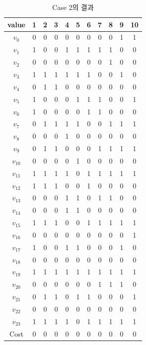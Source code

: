 \documentclass{article}
\begin{document}
    \begin{table}[htb!]
    \centering
    \begin{tabular}{c | c c c c c c c c c c}
        \hline
        value & 1 & 2 & 3 & 4 & 5 & 6 & 7 & 8 & 9 & 10 \\
        \hline
        $v_0$ & 0 & 0 & 0 & 0 & 0 & 0 & 0 & 0 & 1 & 1 \\
        $v_1$ & 1 & 0 & 0 & 1 & 1 & 1 & 1 & 1 & 0 & 0 \\
        $v_2$ & 0 & 0 & 0 & 0 & 0 & 0 & 0 & 1 & 0 & 0 \\
        $v_3$ & 1 & 1 & 1 & 1 & 1 & 1 & 0 & 0 & 1 & 0 \\
        $v_4$ & 0 & 1 & 1 & 0 & 0 & 0 & 0 & 0 & 0 & 0 \\
        $v_5$ & 1 & 0 & 0 & 0 & 1 & 1 & 1 & 0 & 0 & 1 \\
        $v_6$ & 1 & 0 & 0 & 0 & 0 & 1 & 1 & 0 & 0 & 0 \\
        $v_7$ & 0 & 1 & 1 & 1 & 1 & 0 & 0 & 1 & 1 & 1 \\
        $v_8$ & 0 & 0 & 0 & 1 & 0 & 0 & 0 & 0 & 0 & 0 \\
        $v_9$ & 0 & 1 & 1 & 0 & 0 & 0 & 1 & 1 & 1 & 1 \\
        $v_{10}$ & 0 & 0 & 0 & 0 & 1 & 0 & 0 & 0 & 0 & 0 \\
        $v_{11}$ & 1 & 1 & 1 & 1 & 0 & 1 & 1 & 1 & 1 & 1 \\
        $v_{12}$ & 1 & 1 & 1 & 0 & 0 & 1 & 0 & 0 & 0 & 0 \\
        $v_{13}$ & 0 & 0 & 0 & 1 & 1 & 0 & 1 & 1 & 0 & 0 \\
        $v_{14}$ & 0 & 0 & 0 & 1 & 1 & 0 & 0 & 0 & 0 & 0 \\
        $v_{15}$ & 1 & 1 & 1 & 0 & 0 & 1 & 1 & 1 & 1 & 1 \\
        $v_{16}$ & 0 & 0 & 0 & 0 & 0 & 0 & 0 & 0 & 0 & 1 \\
        $v_{17}$ & 1 & 0 & 0 & 1 & 1 & 0 & 0 & 0 & 1 & 0 \\
        $v_{18}$ & 0 & 0 & 0 & 0 & 0 & 0 & 0 & 0 & 0 & 0 \\
        $v_{19}$ & 1 & 1 & 1 & 1 & 1 & 1 & 1 & 1 & 1 & 1 \\
        $v_{20}$ & 0 & 0 & 0 & 0 & 0 & 0 & 1 & 1 & 1 & 0 \\
        $v_{21}$ & 0 & 1 & 1 & 0 & 1 & 1 & 0 & 0 & 0 & 1 \\
        $v_{22}$ & 0 & 0 & 0 & 0 & 0 & 0 & 0 & 0 & 0 & 0 \\
        $v_{23}$ & 1 & 1 & 1 & 1 & 0 & 1 & 1 & 1 & 1 & 1 \\
        \hline
        Cost & 0 & 0 & 0 & 0 & 0 & 0 & 0 & 0 & 0 & 0 \\
        \hline
    \end{tabular}
    \caption{Case 2의 결과}
    \label{tab:result2}
    \end{table}
\end{document}

